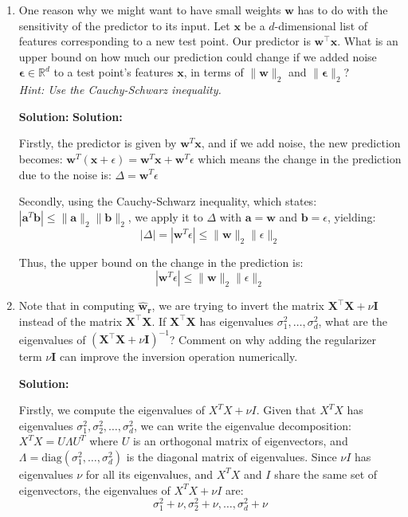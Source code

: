\documentclass{article}
\newcommand{\mat}[1]{\mathbf{#1}}
\renewcommand{\vec}[1]{\boldsymbol{\mathbf{#1}}}
\newenvironment{solution}{\color{blue} \smallskip \textbf{Solution:}}{}
\begin{document}
\begin{enumerate}

    \item One reason why we might want to have small weights $\vec{w}$ has to do with the sensitivity of the predictor to its input. Let $\vec{x}$ be a $d$-dimensional list of features corresponding to a new test point. Our predictor is $\vec{w}^\top \vec{x}$.  What is an upper bound on how much our prediction could change if we added noise $\vec{\epsilon} \in \mathbb{R}^d$ to a test point's features $\vec{x}$, in terms of $\|\vec{w}\|_2$ and $\|\vec\epsilon\|_2$? \\
    \emph{Hint: Use the Cauchy-Schwarz inequality.}
    
    \begin{solution}
\textbf{Solution:}

Firstly, the predictor is given by \( \mathbf{w}^T \mathbf{x} \), and if we add noise, the new prediction becomes:
\(
\mathbf{w}^T (\mathbf{x} + \epsilon) = \mathbf{w}^T \mathbf{x} + \mathbf{w}^T \epsilon
\) which means the change in the prediction due to the noise is:
\(
\Delta = \mathbf{w}^T \epsilon
\)

Secondly, using the Cauchy-Schwarz inequality, which states:
\(
|\mathbf{a}^T \mathbf{b}| \leq \|\mathbf{a}\|_2 \|\mathbf{b}\|_2
\), 
we apply it to \( \Delta \) with \( \mathbf{a} = \mathbf{w} \) and \( \mathbf{b} = \epsilon \), yielding:
\[
|\Delta| = |\mathbf{w}^T \epsilon| \leq \|\mathbf{w}\|_2 \|\epsilon\|_2
\]

Thus, the upper bound on the change in the prediction is:
\[
|\mathbf{w}^T \epsilon| \leq \|\mathbf{w}\|_2 \|\epsilon\|_2
\]

    \end{solution}

    \newpage
    \item Note that in computing $\vec{\hat{w}_r}$, we are trying to invert the matrix $\mat{X}^\top \mat{X} + \nu \mat{I}$ instead of the matrix $\mat{X}^\top \mat{X}$. If $\mat{X}^\top \mat{X}$ has eigenvalues $\sigma_1^2, \ldots, \sigma_d^2$, what are the eigenvalues of $(\mat{X}^\top \mat{X} + \nu \mat{I})^{-1}$? Comment on why adding the regularizer term $\nu \mat{I}$ can improve the inversion operation numerically.
    
    \begin{solution}
    
Firstly, we compute the eigenvalues of \( X^T X + \nu I \). Given that \( X^T X \) has eigenvalues \( \sigma_1^2, \sigma_2^2, \dots, \sigma_d^2 \), we can write the eigenvalue decomposition:
\(
X^T X = U \Lambda U^T
\)
where \( U \) is an orthogonal matrix of eigenvectors, and \( \Lambda = \text{diag}(\sigma_1^2, \dots, \sigma_d^2) \) is the diagonal matrix of eigenvalues. Since \( \nu I \) has eigenvalues \( \nu \) for all its eigenvalues, and \( X^T X \) and \( I \) share the same set of eigenvectors, the eigenvalues of \( X^T X + \nu I \) are:
\[
\sigma_1^2 + \nu, \sigma_2^2 + \nu, \dots, \sigma_d^2 + \nu
\]\\


\end{solution}
\end{enumerate}
\end{document}
